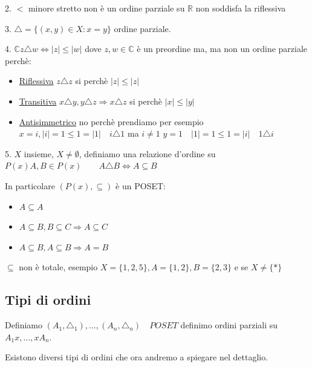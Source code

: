 \documentclass{article}
\theoremstyle{definition}
\begin{document}
2. $ < $ minore stretto non è un ordine parziale su $ \mathbb{R} $ non soddisfa la riflessiva \newline

3. $ \triangle = \{(x,y) \in X : x = y\}$ ordine parziale. \newline 

4. $ \mathbb{C} z \triangle w \Leftrightarrow |z| \le |w| $ dove $ z,w \in \mathbb{C} $  è un preordine ma, ma non un ordine parziale perchè:
\begin{itemize}
        \item \underline{Riflessiva} $ z \triangle z$ si perchè $ |z| \le |z| $
        \item \underline{Transitiva} $ x \triangle y, y \triangle z \Rightarrow x \triangle z$  si perchè $ |x| \le |y| $
        \item \underline{Antisimmetrico} no perchè prendiamo per esempio \newline $ x = i, |i| = 1 \le 1 = |1| \quad i \triangle 1 $ ma $ i \not = 1 $  \newline $ y = 1 \quad |1| = 1 \le 1 = |i| \quad 1 \triangle i $    
\end{itemize}

5. $ X $ insieme, $ X \not = \emptyset $, definiamo una relazione d'ordine su $ P(x)  A,B \in P(x) \quad \quad A \triangle B \Leftrightarrow A \subseteq B $ \par
In particolare $ (P(x), \subseteq )$ è un POSET:\newline
\begin{itemize}
        \item $ A \subseteq A $
        \item $ A \subseteq B, B \subseteq C \Rightarrow A \subseteq C $
        \item $ A \subseteq B, A \subseteq B \Rightarrow A = B $
\end{itemize}
$ \subseteq $ non è totale, esempio $ X = \{1,2,5\}, A = \{1,2\}, B = \{2,3\} $ e se $ X \not = \{*\} $



\subsection{Tipi di ordini}
Definiamo $(A_1, \triangle_1), \ldots, (A_n, \triangle_n) \quad POSET$ definimo ordini parziali su $A_1x, \ldots, xA_n$. \par
Esistono diversi tipi di ordini che ora andremo a spiegare nel dettaglio.
\end{document}
